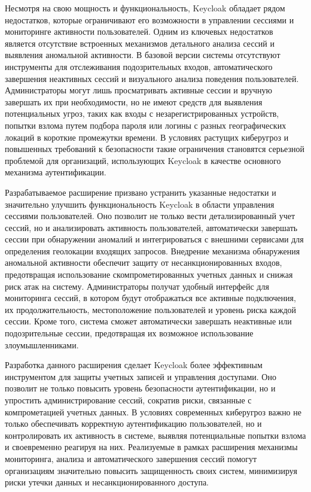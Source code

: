 Несмотря на свою мощность и функциональность, Keycloak обладает рядом недостатков, которые ограничивают его возможности в управлении сессиями и мониторинге активности пользователей. Одним из ключевых недостатков является отсутствие встроенных механизмов детального анализа сессий и выявления аномальной активности. В базовой версии системы отсутствуют инструменты для отслеживания подозрительных входов, автоматического завершения неактивных сессий и визуального анализа поведения пользователей. Администраторы могут лишь просматривать активные сессии и вручную завершать их при необходимости, но не имеют средств для выявления потенциальных угроз, таких как входы с незарегистрированных устройств, попытки взлома путем подбора пароля или логины с разных географических локаций в короткие промежутки времени. В условиях растущих киберугроз и повышенных требований к безопасности такие ограничения становятся серьезной проблемой для организаций, использующих Keycloak в качестве основного механизма аутентификации.

Разрабатываемое расширение призвано устранить указанные недостатки и значительно улучшить функциональность Keycloak в области управления сессиями пользователей. Оно позволит не только вести детализированный учет сессий, но и анализировать активность пользователей, автоматически завершать сессии при обнаружении аномалий и интегрироваться с внешними сервисами для определения геолокации входящих запросов. Внедрение механизма обнаружения аномальной активности обеспечит защиту от несанкционированных входов, предотвращая использование скомпрометированных учетных данных и снижая риск атак на систему. Администраторы получат удобный интерфейс для мониторинга сессий, в котором будут отображаться все активные подключения, их продолжительность, местоположение пользователей и уровень риска каждой сессии. Кроме того, система сможет автоматически завершать неактивные или подозрительные сессии, предотвращая их возможное использование злоумышленниками.

Разработка данного расширения сделает Keycloak более эффективным инструментом для защиты учетных записей и управления доступами. Оно позволит не только повысить уровень безопасности аутентификации, но и упростить администрирование сессий, сократив риски, связанные с компрометацией учетных данных. В условиях современных киберугроз важно не только обеспечивать корректную аутентификацию пользователей, но и контролировать их активность в системе, выявляя потенциальные попытки взлома и своевременно реагируя на них. Реализуемые в рамках расширения механизмы мониторинга, анализа и автоматического завершения сессий помогут организациям значительно повысить защищенность своих систем, минимизируя риски утечки данных и несанкционированного доступа.

